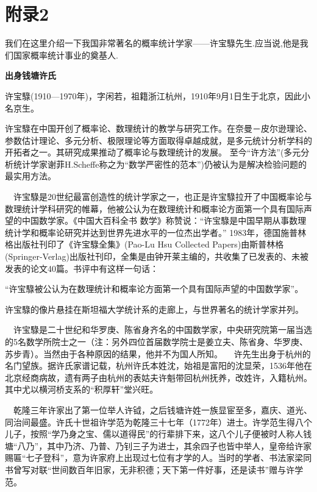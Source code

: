 {}
\section*{附录2} %

我们在这里介绍一下我国非常著名的概率统计学家——许宝騄先生.应当说,他是我们国家概率统计事业的奠基人.

\textbf{出身钱塘许氏}

许宝騄(1910—1970年)，字闲若，祖籍浙江杭州，1910年9月1日生于北京，因此小名京生。

许宝騄在中国开创了概率论、数理统计的教学与研究工作。在奈曼－皮尔逊理论、参数估计理论、多元分析、极限理论等方面取得卓越成就，是多元统计分析学科的开拓者之一。其研究成果推动了概率论与数理统计的发展。 至今“许方法”(多元分析统计学家谢菲H.Scheffe称之为“数学严密性的范本”)仍被认为是解决检验问题的最实用方法。

$\quad$许宝騄是20世纪最富创造性的统计学家之一，也正是许宝騄拉开了中国概率论与数理统计学科研究的帷幕，他被公认为在数理统计和概率论方面第一个具有国际声望的中国数学家。《中国大百科全书 数学》称赞说：“许宝騄是中国早期从事数理统计学和概率论研究并达到世界先进水平的一位杰出学者。” 1983年，德国施普林格出版社刊印了《许宝騄全集》(Pao-Lu Hsu Collected Papers)由斯普林格(Springer-Verlag)出版社刊印，全集是由钟开莱主编的，共收集了已发表的、未被发表的论文40篇。书评中有这样一句话：

“许宝騄被公认为在数理统计和概率论方面第一个具有国际声望的中国数学家”。

许宝騄的像片悬挂在斯坦福大学统计系的走廊上，与世界著名的统计学家并列。

$\quad$许宝騄是二十世纪和华罗庚、陈省身齐名的中国数学家，中央研究院第一届当选的5名数学所院士之一（注：另外四位首届数学院士是姜立夫、陈省身、华罗庚、苏步青）。当然由于各种原因的结果，他并不为国人所知。
$\quad$许先生出身于杭州的名门望族。据许氏家谱记载，杭州许氏本姓沈，始祖是富阳的沈显荣，1536年他在北京经商病故，遗有两子由杭州的表姑夫许魁带回杭州抚养，改姓许，入籍杭州。其中尤以横河桥支系的“积厚轩”堂兴旺。 

$\quad$乾隆三年许家出了第一位举人许钺，之后钱塘许姓一族显宦至多，嘉庆、道光、同治间最盛。许氏十世祖许学范为乾隆三十七年（1772年）进士。许学范生得八个儿子，按照“学乃身之宝、儒以道得民”的行辈排下来，这八个儿子便被时人称人钱塘“八乃”，其中乃济、乃普、乃钊三子为进士，其余四子也皆中举人，皇帝给许家赐匾“七子登科”，意为许家府上出现过七位有才学的人。当时的学者、书法家梁同书曾写对联“世间数百年旧家，无非积德；天下第一件好事，还是读书”赠与许学范。


